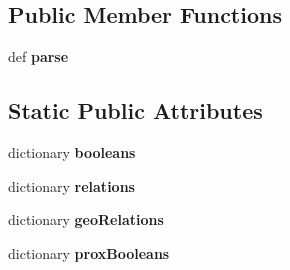 \subsection*{Public Member Functions}
\begin{DoxyCompactItemize}
\item 
\hypertarget{classcheshire3_1_1query_factory_1_1_cheshire2_query_stream_a1bed5c5c863356731400b42e4a4e0b47}{def {\bfseries parse}}\label{classcheshire3_1_1query_factory_1_1_cheshire2_query_stream_a1bed5c5c863356731400b42e4a4e0b47}

\end{DoxyCompactItemize}
\subsection*{Static Public Attributes}
\begin{DoxyCompactItemize}
\item 
dictionary {\bfseries booleans}
\item 
\hypertarget{classcheshire3_1_1query_factory_1_1_cheshire2_query_stream_a898f4ccd5f017cbc5f6cac19892d7b59}{dictionary {\bfseries relations}}\label{classcheshire3_1_1query_factory_1_1_cheshire2_query_stream_a898f4ccd5f017cbc5f6cac19892d7b59}

\item 
dictionary {\bfseries geo\-Relations}
\item 
dictionary {\bfseries prox\-Booleans}
\end{DoxyCompactItemize}


